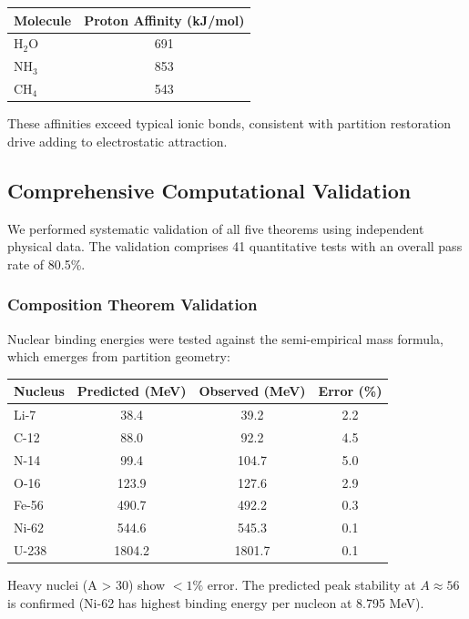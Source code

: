 \documentclass[twocolumn,10pt,a4paper]{article}
\theoremstyle{definition}
\theoremstyle{remark}
\begin{document}
\begin{center}
\begin{tabular}{lc}
\toprule
Molecule & Proton Affinity (kJ/mol) \\
\midrule
H$_2$O & 691 \\
NH$_3$ & 853 \\
CH$_4$ & 543 \\
\bottomrule
\end{tabular}
\end{center}

These affinities exceed typical ionic bonds, consistent with partition restoration drive adding to electrostatic attraction.

\subsection{Comprehensive Computational Validation}

We performed systematic validation of all five theorems using independent physical data. The validation comprises 41 quantitative tests with an overall pass rate of 80.5\%.

\subsubsection{Composition Theorem Validation}

Nuclear binding energies were tested against the semi-empirical mass formula, which emerges from partition geometry:

\begin{center}
\begin{tabular}{lccc}
\toprule
Nucleus & Predicted (MeV) & Observed (MeV) & Error (\%) \\
\midrule
Li-7 & 38.4 & 39.2 & 2.2 \\
C-12 & 88.0 & 92.2 & 4.5 \\
N-14 & 99.4 & 104.7 & 5.0 \\
O-16 & 123.9 & 127.6 & 2.9 \\
Fe-56 & 490.7 & 492.2 & 0.3 \\
Ni-62 & 544.6 & 545.3 & 0.1 \\
U-238 & 1804.2 & 1801.7 & 0.1 \\
\bottomrule
\end{tabular}
\end{center}

Heavy nuclei (A > 30) show $<1\%$ error. The predicted peak stability at $A \approx 56$ is confirmed (Ni-62 has highest binding energy per nucleon at 8.795 MeV).
\end{document}
